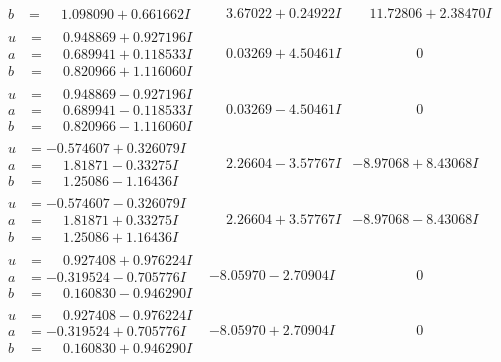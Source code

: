 \documentclass[1p]{elsarticle_modified}
\theoremstyle{definition}
\begin{document}
$$\begin{array}{c|c|c}
\begin{aligned}
b &= \phantom{-}1.098090 + 0.661662 I\end{aligned}
 & \phantom{-}3.67022 + 0.24922 I & \phantom{-}11.72806 + 2.38470 I \\ \hline\begin{aligned}
u &= \phantom{-}0.948869 + 0.927196 I \\
a &= \phantom{-}0.689941 + 0.118533 I \\
b &= \phantom{-}0.820966 + 1.116060 I\end{aligned}
 & \phantom{-}0.03269 + 4.50461 I & \phantom{-0.000000 } 0 \\ \hline\begin{aligned}
u &= \phantom{-}0.948869 - 0.927196 I \\
a &= \phantom{-}0.689941 - 0.118533 I \\
b &= \phantom{-}0.820966 - 1.116060 I\end{aligned}
 & \phantom{-}0.03269 - 4.50461 I & \phantom{-0.000000 } 0 \\ \hline\begin{aligned}
u &= -0.574607 + 0.326079 I \\
a &= \phantom{-}1.81871 - 0.33275 I \\
b &= \phantom{-}1.25086 - 1.16436 I\end{aligned}
 & \phantom{-}2.26604 - 3.57767 I & -8.97068 + 8.43068 I \\ \hline\begin{aligned}
u &= -0.574607 - 0.326079 I \\
a &= \phantom{-}1.81871 + 0.33275 I \\
b &= \phantom{-}1.25086 + 1.16436 I\end{aligned}
 & \phantom{-}2.26604 + 3.57767 I & -8.97068 - 8.43068 I \\ \hline\begin{aligned}
u &= \phantom{-}0.927408 + 0.976224 I \\
a &= -0.319524 - 0.705776 I \\
b &= \phantom{-}0.160830 - 0.946290 I\end{aligned}
 & -8.05970 - 2.70904 I & \phantom{-0.000000 } 0 \\ \hline\begin{aligned}
u &= \phantom{-}0.927408 - 0.976224 I \\
a &= -0.319524 + 0.705776 I \\
b &= \phantom{-}0.160830 + 0.946290 I\end{aligned}
 & -8.05970 + 2.70904 I & \phantom{-0.000000 } 0 \\ \hline\begin{aligned}

\end{aligned}
\end{array}$$
\end{document}
